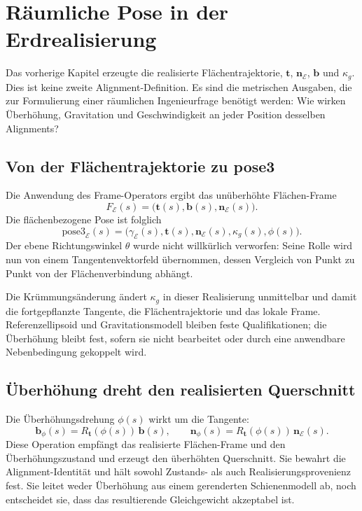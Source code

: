 
\chapter{Räumliche Pose in der Erdrealisierung}

Das vorherige Kapitel erzeugte die realisierte Flächentrajektorie,
\(\mathbf t\), \(\mathbf n_{\mathcal E}\), \(\mathbf b\) und
\(\kappa_g\). Dies ist keine zweite Alignment-Definition. Es sind die
metrischen Ausgaben, die zur Formulierung einer räumlichen Ingenieurfrage
benötigt werden: Wie wirken Überhöhung, Gravitation und Geschwindigkeit an
jeder Position desselben Alignments?

\section{Von der Flächentrajektorie zu pose3}

Die Anwendung des Frame-Operators ergibt das unüberhöhte Flächen-Frame
\[
F_{\mathcal E}(s)=
\bigl(\mathbf t(s),\mathbf b(s),\mathbf n_{\mathcal E}(s)\bigr).
\]
Die flächenbezogene Pose ist folglich
\[
\mathrm{pose3}_{\mathcal E}(s)=
\bigl(
\gamma_{\mathcal E}(s),
\mathbf t(s),
\mathbf n_{\mathcal E}(s),
\kappa_g(s),
\phi(s)
\bigr).
\]
Der ebene Richtungswinkel \(\theta\) wurde nicht willkürlich verworfen: Seine
Rolle wird nun von einem Tangentenvektorfeld übernommen, dessen Vergleich von
Punkt zu Punkt von der Flächenverbindung abhängt.

Die Krümmungsänderung ändert \(\kappa_g\) in dieser Realisierung unmittelbar
und damit die fortgepflanzte Tangente, die Flächentrajektorie und das lokale
Frame. Referenzellipsoid und Gravitationsmodell bleiben feste
Qualifikationen; die Überhöhung bleibt fest, sofern sie nicht bearbeitet oder
durch eine anwendbare Nebenbedingung gekoppelt wird.

\section{Überhöhung dreht den realisierten Querschnitt}

Die Überhöhungsdrehung \(\phi(s)\) wirkt um die Tangente:
\[
\mathbf b_{\phi}(s)
=R_{\mathbf t}(\phi(s))\,\mathbf b(s),
\qquad
\mathbf n_{\phi}(s)
=R_{\mathbf t}(\phi(s))\,\mathbf n_{\mathcal E}(s).
\]
Diese Operation empfängt das realisierte Flächen-Frame und den
Überhöhungszustand und erzeugt den überhöhten Querschnitt. Sie bewahrt die
Alignment-Identität und hält sowohl Zustands- als auch
Realisierungsprovenienz fest. Sie leitet weder Überhöhung aus einem gerenderten
Schienenmodell ab, noch entscheidet sie, dass das resultierende Gleichgewicht
akzeptabel ist.

